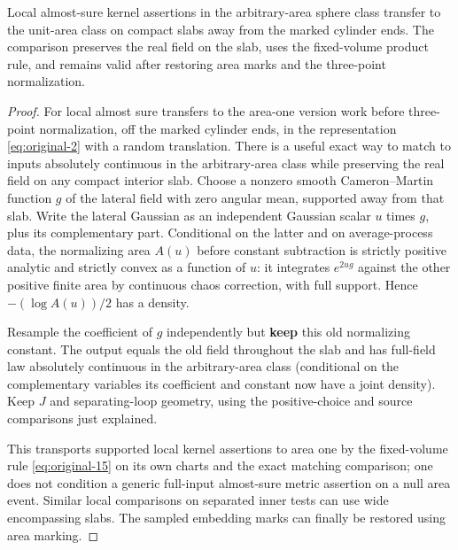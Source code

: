 \begin{lemma}\label{kern:area-one-transfer}
Local almost-sure kernel assertions in the arbitrary-area sphere class transfer to the unit-area
class on compact slabs away from the marked cylinder ends. The comparison preserves the real
field on the slab, uses the fixed-volume product rule, and remains valid after restoring area
marks and the three-point normalization.
\end{lemma}
\begin{proof}

For local almost sure transfers to the area-one version work before three-point normalization, off the
marked cylinder ends, in the representation \eqref{eq:original-2} with a random translation. There is a
useful exact way to match to inputs absolutely continuous in the arbitrary-area class while preserving the
real field on any compact interior slab. Choose a nonzero smooth Cameron–Martin function \(g\) of the
lateral field with zero angular mean, supported away from that slab. Write the lateral Gaussian as an
independent Gaussian scalar \(u\) times \(g\), plus its complementary part. Conditional on the latter and on
average-process data, the normalizing area \(A(u)\) before constant subtraction is strictly positive
analytic and strictly convex as a function of \(u\): it integrates \(e^{2u g}\) against the other positive
finite area by continuous chaos correction, with full support. Hence \(-(\log A(u))/2\) has a density.

Resample the coefficient of \(g\) independently but \textbf{keep} this old normalizing constant. The output
equals the old field throughout the slab and has full-field law absolutely continuous in the arbitrary-area
class (conditional on the complementary variables its coefficient and constant now have a joint density).
Keep \(J\) and separating-loop geometry, using the positive-choice and source comparisons just explained.

This transports supported local kernel assertions to area one by the fixed-volume rule
\eqref{eq:original-15} on its own charts and the exact matching comparison; one does not condition a generic
full-input almost-sure metric assertion on a null area event. Similar local comparisons on separated inner
tests can use wide encompassing slabs. The sampled embedding marks can finally be restored using area
marking.


\end{proof}
